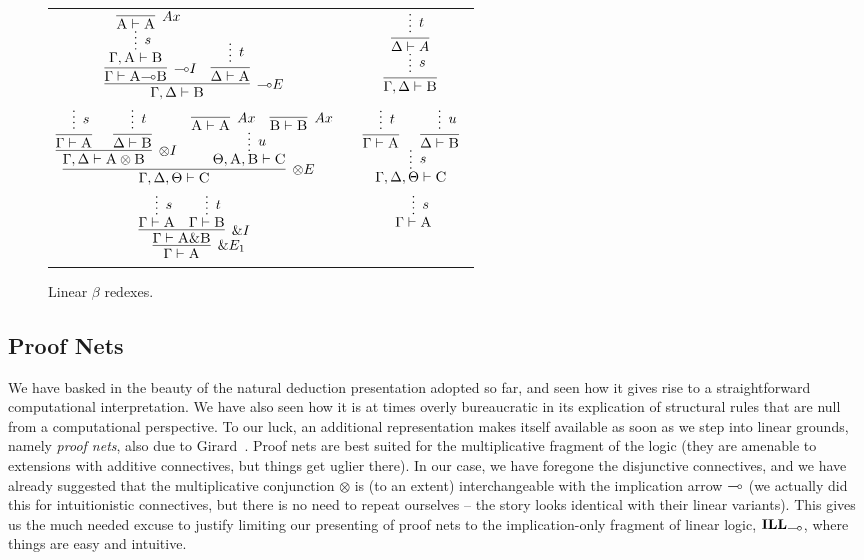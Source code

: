 \begin{figure}
	\centering
	\begin{tabularx}{0.95\textwidth}{@{}ccc@{}}
	$\infer[\li E]{\Gamma, \Delta \vdash \prop{B}}{
	\infer[\li I]{\Gamma \vdash \prop{A} \li \prop{B}}{
		\infer*[s]{\Gamma, \prop{A} \vdash \prop{B}}{
				\infer[Ax]{\prop{A} \vdash \prop{A}}{} 
			}
		}
		&
		\infer{\Delta \vdash \prop{A}}{
			\infer*[t]{}{}
		}
	}$
	&
	\raisebox{20pt}{$\implies$}
	&
	$ 
	\infer[]{\Gamma, \Delta \vdash \prop{B}}{
		\infer*[s]{}{
		\infer[]{\Delta \vdash A}{
			\infer*[t]{}{}
		}}
	}
	$\\[\smallsep]
	$
	\infer[\otimes E]{\Gamma, \Delta, \Theta \vdash \prop{C}}{
		\infer[\otimes I]{\Gamma, \Delta \vdash \prop{A} \otimes \prop{B}}{
			\infer[]{\Gamma \vdash \prop{A}}{\infer*[s]{}{}}
			&
			\infer[]{\Delta \vdash \prop{B}}{\infer*[t]{}{}}
		}		
		&
		\infer*[u]{\Theta, \prop{A}, \prop{B} \vdash \prop{C}}{
			\infer[Ax]{\prop{A} \vdash \prop{A}}{}
			& 
			\infer[Ax]{\prop{B} \vdash \prop{B}}{}
		}
	}
	$
	&
	\raisebox{20pt}{$\implies$}
	&
	$
	\infer*[s]{\Gamma, \Delta, \Theta \vdash \prop{C}}{
		\infer[]{\Gamma \vdash \prop{A}}{
			\infer*[t]{}{}
		}
		&
		\infer[]{\Delta \vdash \prop{B}}{
			\infer*[u]{}{}
		}
	}
	$\\[\smallsep]
	$
	\infer[\with E_1]{\Gamma \vdash \prop{A}}{
		\infer[\with I]{\Gamma \vdash \prop{A} \with \prop{B}}{
			\infer*[s]{\Gamma \vdash \prop{A}}{}
			&
			\infer*[t]{\Gamma \vdash \prop{B}}{}
		}
	}
	$
	&
	\raisebox{10pt}{$\implies$}
	&
	$
	\infer*[s]{\Gamma \vdash \prop{A}}{}
	$
	\end{tabularx}
	\caption{Linear $\beta$ redexes.}
	\label{figure:linear_proof_reductions}
\end{figure}


\subsection{Proof Nets}
We have basked in the beauty of the natural deduction presentation adopted so far, and seen how it gives rise to a straightforward computational interpretation.
We have also seen how it is at times overly bureaucratic in its explication of structural rules that are null from a computational perspective.
To our luck, an additional representation makes itself available as soon as we step into linear grounds, namely \textit{proof nets}, also due to Girard~\cite{girard1987linear}. 
Proof nets are best suited for the multiplicative fragment of the logic (they are amenable to extensions with additive connectives, but things get uglier there).
In our case, we have foregone the disjunctive connectives, and we have already suggested that the multiplicative conjunction $\otimes$ is (to an extent) interchangeable with the implication arrow $\li$ (we actually did this for intuitionistic connectives, but there is no need to repeat ourselves -- the story looks identical with their linear variants).
This gives us the much needed excuse to justify limiting our presenting of proof nets to the implication-only fragment of linear logic, $\ILL_{\li}$, where things are easy and intuitive.

